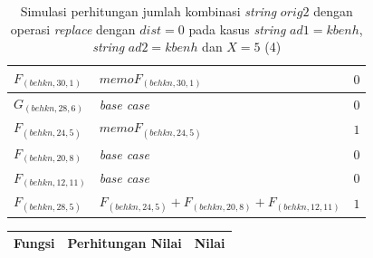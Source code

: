 \begin{appendices}
\begin{table}[H]
\begin{tabular} {|p{3cm}|p{5cm}|p{1cm}|}
  		$ F_{(behkn, 30, 1)}  $ & $memoF_{(behkn, 30, 1)}$ & $ 0 $ \\ \hline
  		$ G_{(behkn, 28, 6)} $ & \textit{base case} & $ 0 $ \\ \hline
  		$ F_{(behkn, 24, 5)}  $ & $memoF_{(behkn, 24, 5)}$ & $ 1 $ \\ \hline
  		$ F_{(behkn, 20, 8)} $ & \textit{base case} & $ 0 $ \\ \hline
  		$ F_{(behkn, 12, 11)} $ & \textit{base case} & $ 0 $ \\ \hline
  		$ F_{(behkn, 28, 5)}  $ & $F_{(behkn, 24, 5)} + F_{(behkn, 20, 8)} + F_{(behkn, 12, 11)}$ & $ 1 $ \\ \hline
  	\end{tabular}\caption{Simulasi perhitungan jumlah kombinasi \textit{string} $ orig2 $ dengan operasi \textit{replace} dengan $ dist= 0  $ pada kasus \textit{string} $ ad1=kbenh $, \textit{string} $ ad2=kbenh $ dan $ X=5 $ (4)}
  	\label{tab:g_3_orig2_0_4}
  \end{table}
  \begin{table}[H]
  	\centering
  	\begin{tabular} {|p{3cm}|p{5cm}|p{1cm}|} \hline
  		Fungsi & Perhitungan Nilai & Nilai \\ \hline
  		

\end{tabular}
\end{table}
\end{appendices}
